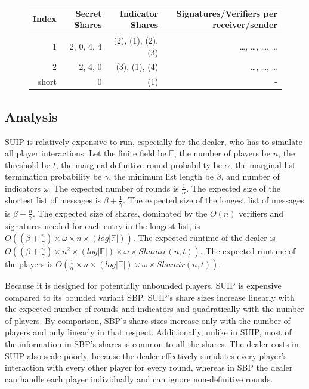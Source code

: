 \documentclass[12pt]{dalcsthesis}
\begin{document}
\begin{figure}
\begin{itemize}
      \begin{tabular}{|r|r|r|r|}
      \hline
        Index & Secret Shares & Indicator Shares & Signatures/Verifiers per receiver/sender \\
      \hline
        1 & 2, 0, 4, 4 & (2), (1), (2), (3) & \ldots, \ldots, \ldots, \ldots\\
      \hline
        2 & 2, 4, 0 & (3), (1), (4) & \ldots, \ldots, \ldots\\
      \hline
        short & 0 & (1) & -\\
      \hline
      \end{tabular}
  \end{itemize}
\end{figure}

\subsection{Analysis}

SUIP is relatively expensive to run, especially for the dealer, who has to simulate all player interactions. Let the finite field be $\mathbb{F}$, the number of players be $n$, the threshold be $t$, the marginal definitive round probability be $\alpha$, the marginal list termination probability be $\gamma$, the minimum list length be $\beta$, and number of indicators $\omega$. The expected number of rounds is $\frac{1}{\alpha}$. The expected size of the shortest list of messages is $\beta + \frac{1}{\gamma}$. The expected size of the longest list of messages is $\beta + \frac{n}{\gamma}$. The expected size of shares, dominated by the $O(n)$ verifiers and signatures needed for each entry in the longest list, is $O((\beta + \frac{n}{\gamma}) \times \omega \times n \times (log |\mathbb{F}|))$. The expected runtime of the dealer is $O((\beta + \frac{n}{\gamma}) \times n^2 \times (log |\mathbb{F}|) \times \omega \times Shamir(n, t))$. The expected runtime of the players is $O(\frac{1}{\alpha} \times n \times (log |\mathbb{F}|) \times \omega \times Shamir(n, t))$.

Because it is designed for potentially unbounded players, SUIP is expensive compared to its bounded variant SBP. SUIP's share sizes increase linearly with the expected number of rounds and indicators and quadratically with the number of players. By comparison, SBP's share sizes increase only with the number of players and only linearly in that respect. Additionally, unlike in SUIP, most of the information in SBP's shares is common to all the shares. The dealer costs in SUIP also scale poorly, because the dealer effectively simulates every player's interaction with every other player for every round, whereas in SBP the dealer can handle each player individually and can ignore non-definitive rounds.
\end{document}
